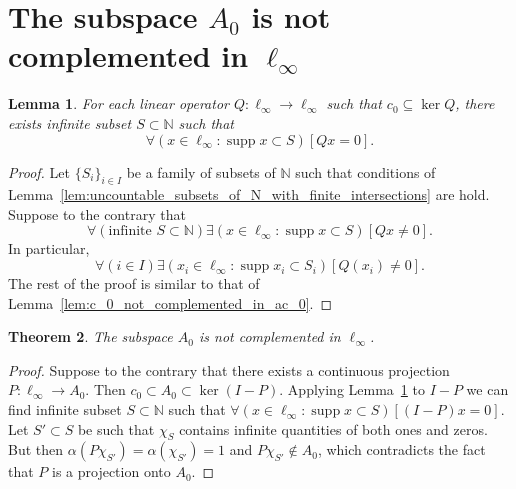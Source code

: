\documentclass[a4paper,14pt]{article} %
\DeclareMathOperator{\supp}{supp}
\theoremstyle{plain}
\newtheorem{theorem}{Theorem}[section]
\newtheorem{lemma}[theorem]{Lemma}
\theoremstyle{definition}
\begin{document}
\section{The subspace $A_0$ is not complemented in $\ell_\infty$}
\label{sec:A0_in_ell_infty}



\begin{lemma}
	\label{lem:c_0_not_complemented}
	For each linear operator $Q: \ell_\infty \to \ell_{\infty}$ such that $c_0\subseteq \ker Q$,
	there exists infinite subset $S \subset \mathbb{N}$ such that
	\begin{equation}
		\forall(x \in \ell_\infty : \supp x \subset S)[Qx = 0]
		.
	\end{equation}
\end{lemma}

\begin{proof}
	Let $\{S_i\}_{i \in I}$ be a family of subsets of $\mathbb{N}$
	such that conditions of Lemma~\ref{lem:uncountable_subsets_of_N_with_finite_intersections} are hold.
	Suppose to the contrary that
	\begin{equation}
		\forall(\mbox{infinite }S\subset\mathbb{N})\exists(x \in \ell_\infty : \supp x \subset S)[Qx \neq 0]
		.
	\end{equation}
	In particular,
	\begin{equation}
		\forall(i\in I)\exists(x_i \in \ell_\infty : \supp x_i \subset S_i)[Q(x_i) \neq 0]
		.
	\end{equation}
	The rest of the proof is similar to that of Lemma~\ref{lem:c_0_not_complemented_in_ac_0}.
\end{proof}





\begin{theorem}
	The subspace $A_0$ is not complemented in $\ell_\infty$.
\end{theorem}

\begin{proof}
	Suppose to the contrary that
	there exists a continuous projection $P: \ell_\infty \to A_0$.
	Then $c_0\subset A_0\subset\ker (I-P)$.
	Applying Lemma~\ref{lem:c_0_not_complemented} to $I-P$
	we can find infinite subset $S\subset\mathbb{N}$
	such that $\forall(x\in\ell_\infty : \supp x \subset S)[(I-P)x = 0]$.
	Let $S' \subset S$ be such that $\chi_S$ contains
	infinite quantities of both ones and zeros.
	But then $\alpha(P\chi_{S'}) = \alpha(\chi_{S'}) = 1$ and $P\chi_{S'} \notin A_0$,
	which contradicts the fact  that $P$ is a projection onto $A_0$.
\end{proof}
\end{document}
